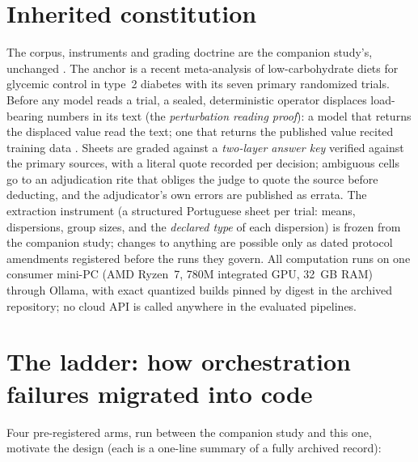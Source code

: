\documentclass[11pt]{article}
\begin{document}
\section{Inherited constitution}

The corpus, instruments and grading doctrine are the companion study's, unchanged \citep{barra2026companion}. The anchor is a recent meta-analysis of low-carbohydrate diets for glycemic control in type~2 diabetes \citep{khraise2026lowcarb} with its seven primary randomized trials. Before any model reads a trial, a sealed, deterministic operator displaces load-bearing numbers in its text (the \emph{perturbation reading proof}): a model that returns the displaced value read the text; one that returns the published value recited training data \citep{xu2024contamination}. Sheets are graded against a \emph{two-layer answer key} verified against the primary sources, with a literal quote recorded per decision; ambiguous cells go to an adjudication rite that obliges the judge to quote the source before deducting, and the adjudicator's own errors are published as errata. The extraction instrument (a structured Portuguese sheet per trial: means, dispersions, group sizes, and the \emph{declared type} of each dispersion) is frozen from the companion study; changes to anything are possible only as dated protocol amendments registered before the runs they govern. All computation runs on one consumer mini-PC (AMD Ryzen~7, 780M integrated GPU, 32~GB RAM) through Ollama, with exact quantized builds pinned by digest in the archived repository; no cloud API is called anywhere in the evaluated pipelines.

\section{The ladder: how orchestration failures migrated into code}

Four pre-registered arms, run between the companion study and this one, motivate the design (each is a one-line summary of a fully archived record):
\end{document}
